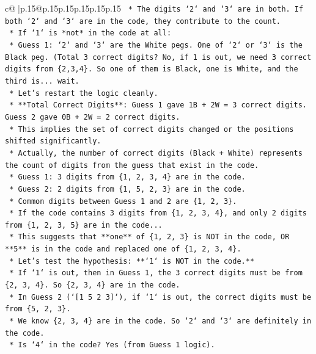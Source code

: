 \documentclass{article}
\begin{document}
{\begin{supertabular}{c@{$\;$}|p{.15\linewidth}@{}p{.15\linewidth}p{.15\linewidth}p{.15\linewidth}p{.15\linewidth}p{.15\linewidth}}
{{{\texttt{        *   The digits `2` and `3` are in both. If both `2` and `3` are in the code, they contribute to the count.} \\
\texttt{        *   If `1` is *not* in the code at all:} \\
\texttt{            *   Guess 1: `2` and `3` are the White pegs. One of `2` or `3` is the Black peg. (Total 3 correct digits? No, if 1 is out, we need 3 correct digits from \{2,3,4\}. So one of them is Black, one is White, and the third is... wait.} \\
\texttt{            *   Let's restart the logic cleanly.} \\
\texttt{            *   **Total Correct Digits**: Guess 1 gave 1B + 2W = 3 correct digits. Guess 2 gave 0B + 2W = 2 correct digits.} \\
\texttt{            *   This implies the set of correct digits changed or the positions shifted significantly.} \\
\texttt{            *   Actually, the number of correct digits (Black + White) represents the count of digits from the guess that exist in the code.} \\
\texttt{            *   Guess 1: 3 digits from \{1, 2, 3, 4\} are in the code.} \\
\texttt{            *   Guess 2: 2 digits from \{1, 5, 2, 3\} are in the code.} \\
\texttt{            *   Common digits between Guess 1 and 2 are \{1, 2, 3\}.} \\
\texttt{            *   If the code contains 3 digits from \{1, 2, 3, 4\}, and only 2 digits from \{1, 2, 3, 5\} are in the code...} \\
\texttt{            *   This suggests that **one** of \{1, 2, 3\} is NOT in the code, OR **5** is in the code and replaced one of \{1, 2, 3, 4\}.} \\
\texttt{            *   Let's test the hypothesis: **`1` is NOT in the code.**} \\
\texttt{                *   If `1` is out, then in Guess 1, the 3 correct digits must be from \{2, 3, 4\}. So \{2, 3, 4\} are in the code.} \\
\texttt{                *   In Guess 2 (`{[}1 5 2 3{]}`), if `1` is out, the correct digits must be from \{5, 2, 3\}.} \\
\texttt{                *   We know \{2, 3, 4\} are in the code. So `2` and `3` are definitely in the code.} \\
\texttt{                *   Is `4` in the code? Yes (from Guess 1 logic).} \\
}}}
\end{supertabular}}
\end{document}
